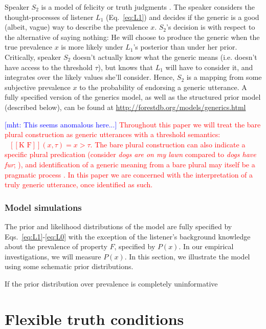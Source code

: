 \documentclass[12pt,letterpaper]{article}
\newcommand{\denote}[1]{\mbox{ $[\![ #1 ]\!]$}}
\newcommand{\red}[1]{\textcolor{Red}{#1}}
\newcommand{\mht}[1]{\textcolor{Blue}{[mht: #1]}}
\begin{document}
Speaker $S_2$ is a model of felicity or truth judgments \cite{Degen2014}.
The speaker considers the thought-processes of listener $L_1$ (Eq.~\ref{eq:L1}) and decides if the generic is a good (albeit, vague) way to describe the  prevalence $x$. 
$S_2$'s decision is with respect to the alternative of saying nothing: He will choose to produce the generic when the true prevalence $x$ is more likely under $L_1$'s posterior than under her prior. 
Critically, speaker $S_{2}$ doesn't actually know what the generic means (i.e. doesn't have access to the threshold $\tau$), but knows that $L_{1}$ will have to consider it, and integrates over the likely values she'll consider.
Hence, $S_2$ is a mapping from some subjective prevalence $x$ to the probability of endorsing a generic utterance. A fully specified version of the generics model, as well as the structured prior model (described below), can be found at \url{http://forestdb.org/models/generics.html}

%

\mht{This seems anomalous here...}
\red{
Throughout this paper we will treat the bare plural construction as generic utterances with a threshold semantics: $\denote{\text{K F}}(x, \tau)=x>\tau$.
The bare plural construction can also indicate a specific plural predication (consider \emph{dogs are on my lawn} compared to \emph{dogs have fur};  \citeNP{Carlson1977}), and identification of a generic meaning from a bare plural may itself be a pragmatic process \cite{Cimpian2008, Declerck1991}. 
In this paper we are concerned with the interpretation of a truly generic utterance, once identified as such.
}

\subsubsection*{Model simulations}

The prior and likelihood distributions of the model are fully specified by Eqs.~\ref{eq:L1}-\ref{eq:L0} with the exception of the listener's background knowledge about the prevalence of property $F$, specified by $P(x)$.
In our empirical investigations, we will measure $P(x)$. 
In this section, we illustrate the model using some schematic prior distributions.

If the prior distribution over prevalence is completely uninformative

\section*{Flexible truth conditions}
\end{document}
